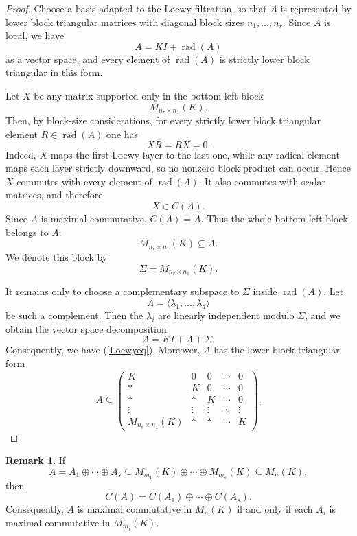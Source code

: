 \documentclass[11pt]{article}
\theoremstyle{remark}
\theoremstyle{plain}
\theoremstyle{definition}
\theoremstyle{myremark}
\newtheorem{remark}{Remark}
\begin{document}
\begin{proof}
	Choose a basis adapted to the Loewy filtration, so that \(A\) is represented by lower block triangular matrices with diagonal block sizes
	$n_1,\dots,n_r.$
	Since \(A\) is local, we have
	\[	A=KI+\operatorname{rad}(A)	\]
	as a vector space, and every element of \(\operatorname{rad}(A)\) is strictly lower block triangular in this form.
	
	Let \(X\) be any matrix supported only in the bottom-left block
	\[
	M_{n_r\times n_1}(K).
	\]
	Then, by block-size considerations, for every strictly lower block triangular element \(R\in \operatorname{rad}(A)\) one has
	\[
	XR=RX=0.
	\]
	Indeed, \(X\) maps the first Loewy layer to the last one, while any radical element maps each layer strictly downward, so no nonzero block product can occur. Hence \(X\) commutes with every element of \(\operatorname{rad}(A)\). It also commutes with scalar matrices, and therefore
	\[
	X\in C(A).
	\]
	Since \(A\) is maximal commutative, \(C(A)=A\). Thus the whole bottom-left block belongs to \(A\):
	\[
	M_{n_r\times n_1}(K)\subseteq A.
	\]
	We denote this block by
	\[
	\Sigma=M_{n_r\times n_1}(K).
	\]
	
	It remains only to choose a complementary subspace to \(\Sigma\) inside \(\operatorname{rad}(A)\). Let
	\[
	\Lambda=\langle \lambda_1,\dots,\lambda_d\rangle
	\]
	be such a complement. Then the \(\lambda_i\) are linearly independent modulo \(\Sigma\), and we obtain the vector space decomposition
	\[
	A=KI+\Lambda+\Sigma.
	\]
	Consequently, we have (\ref{Loewyeq}). Moreover, \(A\) has the lower block triangular form
	\[
	A
	\subseteq
	\begin{pmatrix}
		K & 0 & 0 & \cdots & 0\\
		* & K & 0 & \cdots & 0\\
		* & * & K & \cdots & 0\\
		\vdots & \vdots & \vdots & \ddots & \vdots\\
		M_{n_r\times n_1}(K) & * & * & \cdots & K
	\end{pmatrix}. 
	\]
\end{proof}







\begin{remark}
	If
	\[
	A=A_1\oplus\cdots\oplus A_s
	\subseteq
	M_{m_1}(K)\oplus\cdots\oplus M_{m_s}(K)\subseteq M_n(K),
	\]
	then
	\[
	C(A)=C(A_1)\oplus\cdots\oplus C(A_s).
	\]
	Consequently, \(A\) is maximal commutative in \(M_n(K)\) if and only if each
	\(A_i\) is maximal commutative in \(M_{m_i}(K)\).
\end{remark}
\end{document}
